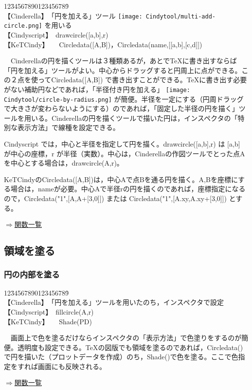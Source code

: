 \documentclass[papersize,a4paper,12pt,uplatex]{jsarticle}
\begin{document}
\begin{tabbing}
12\=34567890123456789\=\kill\\

\>【Cinderella】　\>「円を加える」ツール \texttt{[image: Cindytool/multi-add-circle.png]} を用いる\\ 
\>【Cindyscript】　\>drawcircle([a,b],r)\\
 \>【KeTCindy】　　\>Circledata([A,B])，Circledata(name,[[a,b],[c,d]])\\
\end{tabbing}
　Cinderellaの円を描くツールは３種類あるが，あとでTeXに書き出すならば「円を加える」ツールがよい。中心からドラッグすると円周上に点ができる。この２点を使ってCircledata([A,B]) で書き出すことができる。TeXに書き出す必要がない補助円などであれば，「半径付き円を加える」 \texttt{[image: Cindytool/circle-by-radius.png]} が簡便。半径を一定にする（円周ドラッグで大きさが変わらないようにする）のであれば，「固定した半径の円を描く」ツールを用いる。Cinderellaの円を描くツールで描いた円は，インスペクタの「特別な表示方法」で線種を設定できる。

Cindyscript では，中心と半径を指定して円を描く。drawcircle([a,b],r) は [a,b] が中心の座標，r が半径（実数）。中心は，Cinderellaの作図ツールでとった点Aを中心とする場合は，drawcircle(A,r)。

KeTCindyのCircledata([A,B])は，中心Aで点Bを通る円を描く。A,Bを座標にする場合は，nameが必要。中心Aで半径rの円を描くのであれば，座標指定になるので，Circledata("1",[A,A+[3,0]]) または Circledata("1",[A.xy,A.xy+[3,0]]) とする。
\begin{flushright} \hyperlink{functionlist3d}{$\Rightarrow$関数一覧}\end{flushright}

\subsection{領域を塗る}
\subsubsection{円の内部を塗る}
\begin{tabbing}
12\=34567890123456789\=\kill\\

\>【Cinderella】　\>「円を加える」ツールを用いたのち，インスペクタで設定\\ 
\>【Cindyscript】　\>fillcircle(A,r)　\\
 \>【KeTCindy】　　\>Shade(PD)\\
\end{tabbing}
　画面上で色を塗るだけならインスペクタの「表示方法」で色塗りをするのが簡便。透明度も設定できる。TeXの図版でも領域を塗るのであれば，Circledata()で円を描いた（プロットデータを作成）のち，Shade()で色を塗る。ここで色指定をすれば画面にも反映される。\\
\begin{flushright} \hyperlink{functionlist3d}{$\Rightarrow$関数一覧}\end{flushright}
\end{document}
